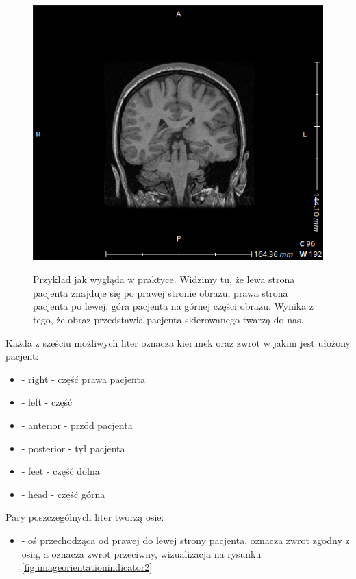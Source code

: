 \begin{itemize}
    \begin{figure}[h]
        \caption{
            Przykład jak wygląda  w praktyce.
            Widzimy tu, że lewa strona pacjenta znajduje się po prawej stronie obrazu, prawa strona pacjenta po lewej, góra pacjenta na górnej części obrazu.
            Wynika z tego, że obraz przedstawia pacjenta skierowanego twarzą do nas.
            }
        \includegraphics[width=\textwidth]{img/imageorientationindicator-002.png}
        \centering
        \label{fig:imageorientationindicator1}
    \end{figure}
    
    Każda z sześciu możliwych liter oznacza kierunek oraz zwrot w jakim jest ułożony pacjent:
    \begin{itemize}
        \item {} - right - część prawa pacjenta
        \item {} - left - część 
        \item {} - anterior - przód pacjenta
        \item {} - posterior - tył pacjenta
        \item {} - feet - część dolna
        \item {} - head - część górna
    \end{itemize}

    Pary poszczególnych liter tworzą osie:
    \begin{itemize}
        \item {} - oś przechodząca od prawej do lewej strony pacjenta,  oznacza zwrot zgodny z osią, a  oznacza zwrot przeciwny, wizualizacja na rysunku \ref{fig:imageorientationindicator2}


\end{itemize}
\end{itemize}
